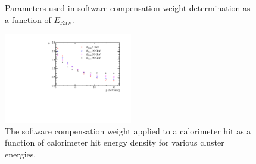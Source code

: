\begin{figure}[h!]
\caption[Parameters used in software compensation weight determination as a function of $E_{\text{Raw}}$.]{Parameters used in software compensation weight determination as a function of $E_{\text{Raw}}$.}
\label{fig:softcompparams}
\end{figure}

\begin{figure}[h!]
\includegraphics[width=0.5\textwidth]{EnergyEstimators/Plots/SoftComp/Weights/SoftwareCompensationWeights.pdf}
\caption[The software compensation weight applied to a calorimeter hit as a function of calorimeter hit energy density for various cluster energies.]{The software compensation weight applied to a calorimeter hit as a function of calorimeter hit energy density for various cluster energies.}
\label{fig:softcompweights}
\end{figure}

